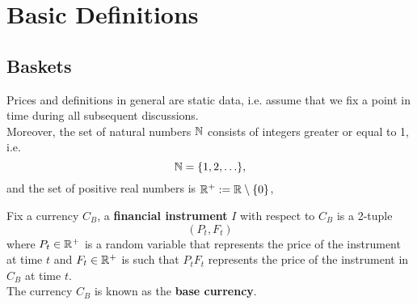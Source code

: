 \documentclass[11pt,fleqn]{book} %
\begin{document}


\pagestyle{empty} %

\tableofcontents %

\cleardoublepage %

\pagestyle{fancy} %





\chapter{Basic Definitions}

\section{Baskets}

\begin{remark} \label{rmk:111}
Prices and definitions in general are static data, i.e. assume that we fix a point in time during all
subsequent discussions.\\
Moreover, the set of natural numbers \(\mathbb{N}\) consists of integers greater or equal to 1, i.e.
\[
\mathbb{N} = \{1, 2, \ldots \},
\]
and the set of positive real numbers is \(\mathbb{R}^+ := \mathbb{R} \setminus \{0\}\),
\end{remark}

\begin{definition} \label{def:112}
Fix a currency \(C_B\), a \textbf{financial instrument} \(I\) with respect to \(C_B\) is a 2-tuple
\[
(P_t, F_t)
\]
where \(P_t \in \mathbb{R}^+\) is a random variable that represents the price of the instrument at time \(t\) and
\(F_t \in \mathbb{R}^+\) is such that \(P_tF_t\) represents the price of the instrument in \(C_B\) at time \(t\).\\
The currency \(C_B\) is known as the \textbf{base currency}.
\end{definition}
\end{document}
